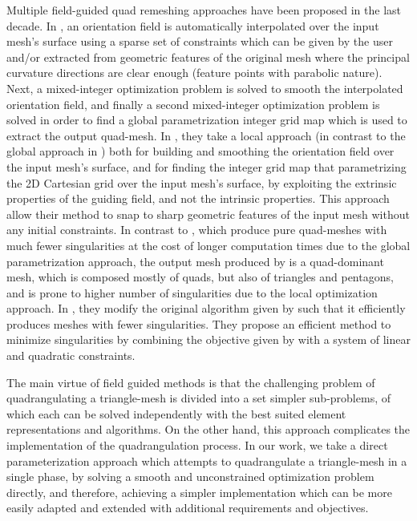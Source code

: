 \par
Multiple field-guided quad remeshing approaches have been proposed in the last decade. In \cite{10.1145/1531326.1531383}, an orientation field is automatically interpolated over the input mesh's surface using a sparse set of constraints which can be given by the user and/or extracted from geometric features of the original mesh where the principal curvature directions are clear enough (feature points with parabolic nature). Next, a mixed-integer optimization problem is solved to smooth the interpolated orientation field, and  finally a second mixed-integer optimization problem is solved in order to find a global parametrization integer grid map which is used to extract the output quad-mesh. In \cite{10.1145/2816795.2818078}, they take a local approach (in contrast to the global approach in \cite{10.1145/1531326.1531383}) both for building and smoothing the orientation field over the input mesh's surface, and for finding the integer grid map that parametrizing the 2D Cartesian grid over the input mesh's surface, by exploiting the extrinsic properties of the guiding field, and not the intrinsic properties. This approach allow their method to snap to sharp geometric features of the input mesh without any initial constraints. In contrast to \cite{10.1145/2816795.2818078}, which produce pure quad-meshes with much fewer singularities at the cost of longer computation times due to the global parametrization approach, the output mesh produced by \cite{10.1145/2816795.2818078} is a quad-dominant mesh, which is composed mostly of quads, but also of triangles and pentagons, and is prone to higher number of singularities due to the local optimization approach. In \cite{10.1111:cgf.13498}, they modify the original algorithm given by \cite{10.1145/2816795.2818078} such that it efficiently produces meshes with fewer singularities. They propose an efficient method to minimize singularities by combining the objective given by \cite{10.1145/2816795.2818078} with a system of linear and quadratic constraints.

\par
The main virtue of field guided methods is that the challenging problem of quadrangulating a triangle-mesh is divided into a set simpler sub-problems, of which each can be solved independently with the best suited element representations and algorithms. On the other hand, this approach complicates the implementation of the quadrangulation process. In our work, we take a direct parameterization approach which attempts to quadrangulate a triangle-mesh in a single phase, by solving a smooth and unconstrained optimization problem directly, and therefore, achieving a simpler implementation which can be more easily adapted and extended with additional requirements and objectives. 